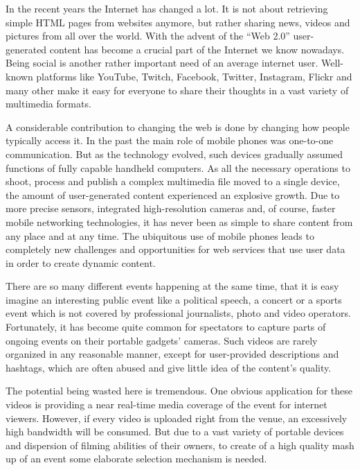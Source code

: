 \documentclass[conference]{IEEEtran}
\begin{document}
In the recent years the Internet has changed a lot. 
It is not about retrieving simple HTML pages from websites anymore, 
but rather sharing news, videos and pictures from all over the world.
With the advent of the ``Web 2.0'' user-generated content has become a crucial part of the Internet we know nowadays.
Being social is another rather important need of an average internet user.
Well-known platforms like YouTube, Twitch, Facebook, Twitter, Instagram, Flickr and many other
make it easy for everyone to share their thoughts in a vast variety of multimedia formats.

A considerable contribution to changing the web is done by changing how people typically access it.
In the past the main role of mobile phones was one-to-one communication. 
But as the technology evolved, such devices gradually assumed functions of fully capable handheld computers.
As all the necessary operations to shoot, process and publish a complex multimedia file moved to a single device, 
the amount of user-generated content experienced an explosive growth.
Due to more precise sensors, integrated high-resolution cameras and, of course, faster mobile networking technologies, 
it has never been as simple to share content from any place and at any time.
The ubiquitous use of mobile phones leads to completely new challenges and opportunities for web services 
that use user data in order to create dynamic content.

There are so many different events happening at the same time, 
that it is easy imagine an interesting public event like a political speech, 
a concert or a sports event which is not covered by professional journalists, photo and video operators.
Fortunately, it has become quite common for spectators to capture parts of ongoing events on their portable gadgets' cameras.
Such videos are rarely organized in any reasonable manner, except for user-provided descriptions and hashtags, 
which are often abused and give little idea of the content's quality.

The potential being wasted here is tremendous. 
One obvious application for these videos is providing a near real-time media coverage of the event for internet viewers.
However, if every video is uploaded right from the venue, an excessively high bandwidth will be consumed.
But due to a vast variety of portable devices and dispersion of filming abilities of their owners,
to create of a high quality mash up of an event some elaborate selection mechanism is needed.
\end{document}
